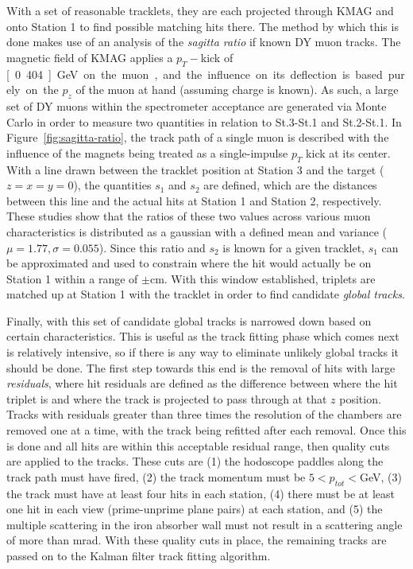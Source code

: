 With a set of reasonable tracklets, they are each projected through KMAG and onto Station 1 to find possible matching hits there. The method by which this is done makes use of an analysis of the \emph{sagitta ratio} if known DY muon tracks.  The magnetic field of KMAG applies a $p_T-$kick of \unit[0.404]{GeV} on the muon, and the influence on its deflection is based purely on the $p_z$ of the muon at hand (assuming charge is known). As such, a large set of DY muons within the spectrometer acceptance are generated via Monte Carlo in order to measure two quantities in relation to St.3-St.1 and St.2-St.1. In Figure~\ref{fig:sagitta-ratio}, the track path of a single muon is described with the influence of the magnets being treated as a single-impulse $p_T$ kick at its center. With a line drawn between the tracklet position at Station 3 and the target ($z=x=y=0$), the quantities $s_1$ and $s_2$ are defined, which are the distances between this line and the actual hits at Station 1 and Station 2, respectively. These studies show that the ratios of these two values across various muon characteristics is distributed as a gaussian with a defined mean and variance ($\mu=1.77, \sigma=0.055$). Since this ratio and $s_2$ is known for a given tracklet, $s_1$ can be approximated and used to constrain where the hit would actually be on Station 1 within a range of $\pm$\unit[5]{cm}. With this window established, triplets are matched up at Station 1 with the tracklet in order to find candidate \emph{global tracks}.

Finally, with this set of candidate global tracks is narrowed down based on certain characteristics. This is useful as the track fitting phase which comes next is relatively intensive, so if there is any way to eliminate unlikely global tracks it should be done. The first step towards this end is the removal of hits with large \emph{residuals}, where hit residuals are defined as the difference between where the hit triplet is and where the track is projected to pass through at that $z$ position. Tracks with residuals greater than three times the resolution of the chambers are removed one at a time, with the track being refitted after each removal. Once this is done and all hits are within this acceptable residual range, then quality cuts are applied to the tracks. These cuts are (1) the hodoscope paddles along the track path must have fired, (2) the track momentum must be $5<p_{tot}<$\unit[100]{GeV}, (3) the track must have at least four hits in each station, (4) there must be at least one hit in each view (prime-unprime plane pairs) at each station, and (5) the multiple scattering in the iron absorber wall must not result in a scattering angle of more than \unit[30]{mrad}. With these quality cuts in place, the remaining tracks are passed on to the Kalman filter track fitting algorithm.

